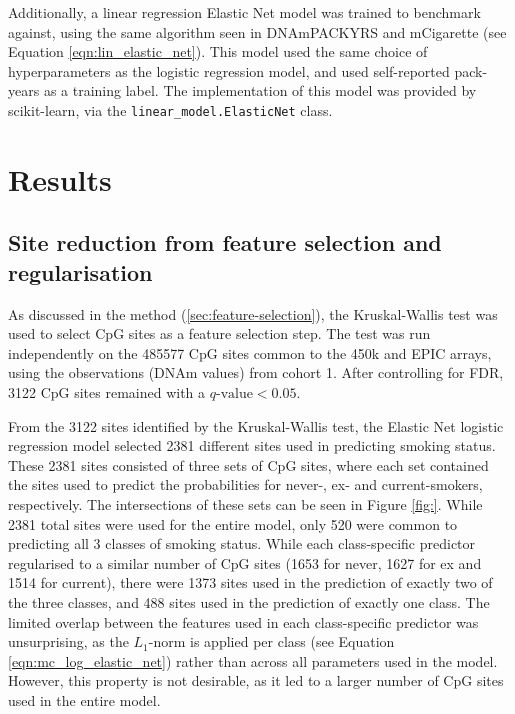 \documentclass{article} %
\begin{document}
Additionally, a linear regression Elastic Net model was trained to benchmark against, using the same algorithm seen in DNAmPACKYRS and mCigarette (see Equation \ref{eqn:lin_elastic_net}). This model used the same choice of hyperparameters as the logistic regression model, and used self-reported pack-years as a training label. The implementation of this model was provided by scikit-learn, via the \verb|linear_model.ElasticNet| class.

\section{Results} \label{sec:results}

\subsection{Site reduction from feature selection and regularisation}
As discussed in the method (\ref{sec:feature-selection}), the Kruskal-Wallis test was used to select CpG sites as a feature selection step. The test was run independently on the \num{485577} CpG sites common to the 450k and EPIC arrays, using the observations (DNAm values) from cohort 1. After controlling for FDR, \num{3122} CpG sites remained with a \(q\text{-value} < 0.05\).

From the \num{3122} sites identified by the Kruskal-Wallis test, the Elastic Net logistic regression model selected \num{2381} different sites used in predicting smoking status. These \num{2381} sites consisted of three sets of CpG sites, where each set contained the sites used to predict the probabilities for never-, ex- and current-smokers, respectively.
The intersections of these sets can be seen in Figure \ref{fig:}. While \num{2381} total sites were used for the entire model, only \num{520} were common to predicting all 3 classes of smoking status. While each class-specific predictor regularised to a similar number of CpG sites (\num{1653} for never, \num{1627} for ex and \num{1514} for current), there were \num{1373} sites used in the prediction of exactly two of the three classes, and \num{488} sites used in the prediction of exactly one class. The limited overlap between the features used in each class-specific predictor was unsurprising, as the \(L_1\)-norm is applied per class (see Equation \ref{eqn:mc_log_elastic_net}) rather than across all parameters used in the model. However, this property is not desirable, as it led to a larger number of CpG sites used in the entire model.
\end{document}
